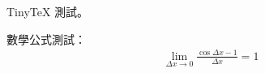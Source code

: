 \documentclass{article}
\begin{document}
TinyTeX 測試。

數學公式測試：
\begin{align*}
    \lim\limits_{\Delta x \rightarrow 0} \frac{\cos \Delta x-1}{\Delta x} = 1
\end{align*}
\end{document}
